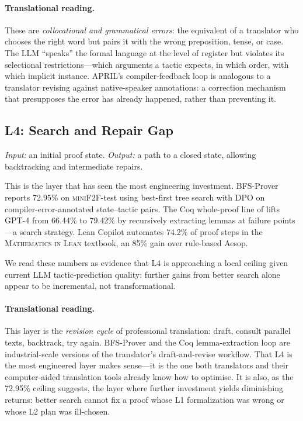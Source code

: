 \documentclass[11pt,letterpaper]{article}
\begin{document}
\paragraph{Translational reading.}
These are \emph{collocational and grammatical errors}: the equivalent
of a translator who chooses the right word but pairs it with the wrong
preposition, tense, or case. The LLM ``speaks'' the formal language at
the level of register \cite{swales1990genre} but violates its
selectional restrictions---which arguments a tactic expects, in which
order, with which implicit instance. APRIL's compiler-feedback loop is
analogous to a translator revising against native-speaker annotations:
a correction mechanism that presupposes the error has already happened,
rather than preventing it.

\subsection{L4: Search and Repair Gap}
\label{sec:l4}

\emph{Input:} an initial proof state. \emph{Output:} a path to a
closed state, allowing backtracking and intermediate repairs.

This is the layer that has seen the most engineering investment.
BFS-Prover \cite{xin2025bfsprover} reports 72.95\% on
\textsc{miniF2F}-test using best-first tree search with DPO on
compiler-error-annotated state--tactic pairs. The Coq whole-proof
line of \citet{prasad2024coq} lifts GPT-4 from 66.44\% to 79.42\% by
recursively extracting lemmas at failure points---a search strategy.
Lean Copilot \cite{song2024leancopilot} automates 74.2\% of proof
steps in the \textsc{Mathematics in Lean} textbook, an 85\% gain over
rule-based Aesop.

We read these numbers as evidence that L4 is approaching a local
ceiling given current LLM tactic-prediction quality: further gains
from better search alone appear to be incremental, not transformational.

\paragraph{Translational reading.}
This layer is the \emph{revision cycle} of professional translation:
draft, consult parallel texts, backtrack, try again. BFS-Prover and the
Coq lemma-extraction loop are industrial-scale versions of the
translator's draft-and-revise workflow. That L4 is the most engineered
layer makes sense---it is the one both translators and their
computer-aided translation tools already know how to optimise. It is
also, as the 72.95\% ceiling suggests, the layer where further
investment yields diminishing returns: better search cannot fix a
proof whose L1 formalization was wrong or whose L2 plan was ill-chosen.
\end{document}
